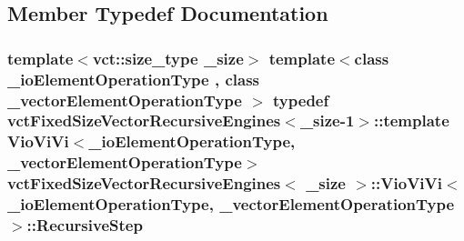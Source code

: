\subsection{Member Typedef Documentation}
\hypertarget{classvct_fixed_size_vector_recursive_engines_1_1_vio_vi_vi_af67bb1f70825ededcfe0b1cc9b02241b}{
\subsubsection[{Recursive\-Step}]{\setlength{\rightskip}{0pt plus 5cm}template$<$vct\-::size\-\_\-type \-\_\-size$>$ template$<$class \-\_\-io\-Element\-Operation\-Type , class \-\_\-vector\-Element\-Operation\-Type $>$ typedef {\bf vct\-Fixed\-Size\-Vector\-Recursive\-Engines}$<$\-\_\-size-\/1$>$\-::template {\bf Vio\-Vi\-Vi}$<$\-\_\-io\-Element\-Operation\-Type, \-\_\-vector\-Element\-Operation\-Type$>$ {\bf vct\-Fixed\-Size\-Vector\-Recursive\-Engines}$<$ \-\_\-size $>$\-::{\bf Vio\-Vi\-Vi}$<$ \-\_\-io\-Element\-Operation\-Type, \-\_\-vector\-Element\-Operation\-Type $>$\-::{\bf Recursive\-Step}}}\label{classvct_fixed_size_vector_recursive_engines_1_1_vio_vi_vi_af67bb1f70825ededcfe0b1cc9b02241b}


